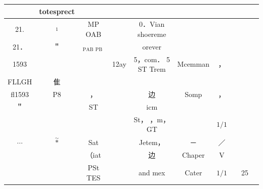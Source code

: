 \documentclass[10pt]{article}
\begin{document}
\begin{center}
\begin{tabular}{|c|c|c|c|c|c|c|c|c|c|}
 & totesprect &  &  &  &  \\
\hline
21. & \(\stackrel{1}{ }\) & MP OAB &  & 0．Vian shoereme &  &  &  &  &  \\
\hline
21． & ＂ & \({ }_{\text {PAB }}{ }_{\text {PB }}\) &  & orever &  &  &  &  &  \\
\hline
1593 &  &  & 12ay & 5，com． 5 ST Trem & Mcemman & ， &  &  &  \\
\hline
FLLGH & 隹 &  &  &  &  &  &  &  &  \\
\hline
fl1593 & P8 & ， &  & 边 & Somp & ， &  &  &  \\
\hline
＂ &  & ST &  & icm &  &  &  &  &  \\
\hline
 &  &  &  & St， ，m，GT &  & \(1 / 1\) &  &  &  \\
\hline
\(\cdots\) & \(\stackrel{\sim}{*}\) & Sat &  & Jetem， & － & ／ &  &  &  \\
\hline
 &  & （iat &  & 边 & Chaper & V &  &  &  \\
\hline
 &  & PSt TES &  & and mex & Cater & \(1 / 1\) &  & 25 &  \\
\hline

\end{tabular}
\end{center}
\end{document}
